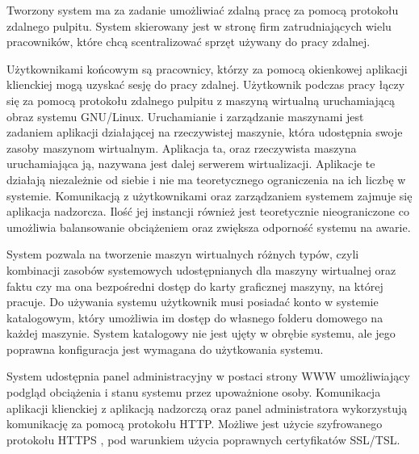 \documentclass[../wstep.tex]{subfiles}
\begin{document}
Tworzony system ma za zadanie umożliwiać zdalną pracę za pomocą protokołu zdalnego pulpitu. System skierowany jest w stronę firm zatrudniających wielu pracowników, które chcą scentralizować sprzęt używany do pracy zdalnej.

Użytkownikami końcowym są pracownicy, którzy za pomocą okienkowej aplikacji klienckiej mogą uzyskać sesję do pracy zdalnej. Użytkownik podczas pracy łączy się za pomocą protokołu zdalnego pulpitu z maszyną wirtualną uruchamiającą obraz systemu GNU/Linux. Uruchamianie i zarządzanie maszynami jest zadaniem aplikacji działającej na rzeczywistej maszynie, która udostępnia swoje zasoby maszynom wirtualnym. Aplikacja ta, oraz rzeczywista maszyna uruchamiająca ją, nazywana jest dalej serwerem wirtualizacji. Aplikacje te działają niezależnie od siebie i nie ma teoretycznego ograniczenia na ich liczbę w systemie. Komunikacją z użytkownikami oraz zarządzaniem systemem zajmuje się aplikacja nadzorcza. Ilość jej instancji również jest teoretycznie nieograniczone co umożliwia balansowanie obciążeniem oraz zwiększa odporność systemu na awarie.

System pozwala na tworzenie maszyn wirtualnych różnych typów, czyli kombinacji zasobów systemowych udostępnianych dla maszyny wirtualnej oraz faktu czy ma ona bezpośredni dostęp do karty graficznej maszyny, na której pracuje. Do używania systemu użytkownik musi posiadać konto w systemie katalogowym, który umożliwia im dostęp do własnego folderu domowego na każdej maszynie. System katalogowy nie jest ujęty w obrębie systemu, ale jego poprawna konfiguracja jest wymagana do użytkowania systemu.

System udostępnia panel administracyjny w postaci strony WWW umożliwiający podgląd obciążenia i stanu systemu przez upoważnione osoby. Komunikacja aplikacji klienckiej z aplikacją nadzorczą oraz panel administratora wykorzystują komunikację za pomocą protokołu HTTP. Możliwe jest użycie szyfrowanego protokołu HTTPS \parencite{rfc2818}, pod warunkiem użycia poprawnych certyfikatów SSL/TSL.
\end{document}
